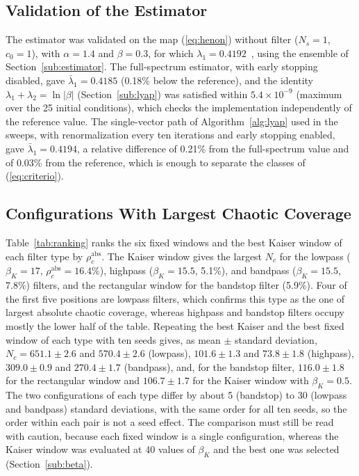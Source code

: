 \documentclass[journal]{IEEEtran}
\begin{document}
\subsection{Validation of the Estimator}\label{sub:validation}
The estimator was validated on the map (\ref{eq:henon}) without filter
($N_s=1$, $c_0=1$), with $\alpha=1.4$ and $\beta=0.3$, for which
$\lambda_1=0.4192$~\cite{Sprott2003}, using the ensemble of
Section~\ref{sub:estimator}. The full-spectrum estimator, with early stopping
disabled, gave $\bar{\lambda}_1=0.4185$ (0.18\% below the reference), and the identity
$\lambda_1+\lambda_2=\ln|\beta|$ (Section~\ref{sub:lyap}) was satisfied
within $5.4\times10^{-9}$ (maximum over the 25 initial conditions), which
checks the implementation independently of the reference value. The single-vector
path of Algorithm~\ref{alg:lyap} used in the sweeps, with renormalization every
ten iterations and early stopping enabled, gave $\bar{\lambda}_1=0.4194$, a
relative difference of 0.21\% from the full-spectrum value and of 0.03\% from
the reference, which is enough to separate the classes of (\ref{eq:criterio}).

\subsection{Configurations With Largest Chaotic Coverage}\label{sub:classification}
Table~\ref{tab:ranking} ranks the six fixed windows and the best Kaiser window
of each filter type by $\rho_c^\text{abs}$. The Kaiser window gives the largest
$N_c$ for the lowpass ($\beta_K=17$, $\rho_c^\text{abs}=16.4\%$), highpass
($\beta_K=15.5$, 5.1\%), and bandpass ($\beta_K=15.5$, 7.8\%) filters, and the
rectangular window for the bandstop filter (5.9\%). Four of the first five
positions are lowpass filters, which confirms this type as the one of largest
absolute chaotic coverage, whereas highpass and bandstop filters occupy mostly
the lower half of the table. Repeating the best Kaiser and the best fixed
window of each type with ten seeds gives, as mean $\pm$ standard deviation,
$N_c=651.1\pm2.6$ and $570.4\pm2.6$ (lowpass), $101.6\pm1.3$ and
$73.8\pm1.8$ (highpass), $309.0\pm0.9$ and $270.4\pm1.7$ (bandpass), and,
for the bandstop filter, $116.0\pm1.8$ for the rectangular window and
$106.7\pm1.7$ for the Kaiser window with $\beta_K=0.5$. The two
configurations of each type differ by about 5 (bandstop) to 30 (lowpass and
bandpass) standard deviations, with the same order for all ten seeds, so the
order within each pair is not a seed effect. The comparison must
still be read with caution, because each fixed window is a single
configuration, whereas the Kaiser window was evaluated at 40 values of
$\beta_K$ and the best one was selected
(Section~\ref{sub:beta}).
\end{document}
